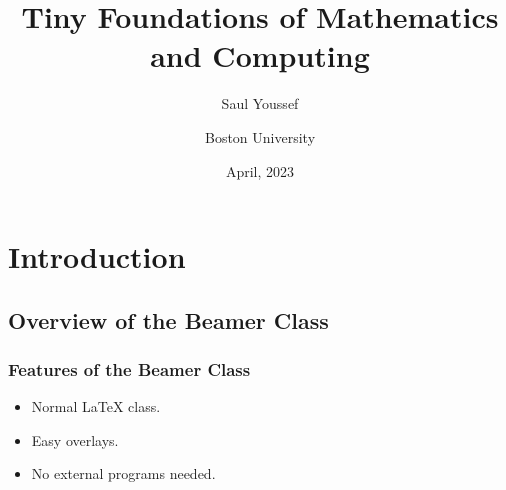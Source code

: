 \documentclass{beamer}
\title{Tiny Foundations of Mathematics and Computing}
\author{Saul Youssef}
\author{Boston University}
\date{April, 2023}
\begin{document}
\frame{\titlepage}

\section[Outline]{}
\frame{\tableofcontents}

\section{Introduction}
\subsection{Overview of the Beamer Class}
\frame
{
  \frametitle{Features of the Beamer Class}

  \begin{itemize}
  \item<1-> Normal LaTeX class.
  \item<2-> Easy overlays.
  \item<3-> No external programs needed.      
  \end{itemize}
}
\end{document}

